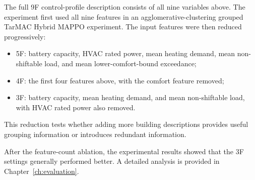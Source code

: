 The full 9F control-profile description consists of all nine variables above.
The experiment first used all nine features in an agglomerative-clustering
grouped TarMAC Hybrid MAPPO experiment. The input features were then reduced
progressively:
\begin{itemize}
  \item 5F: battery capacity, HVAC rated power, mean heating demand, mean
  non-shiftable load, and mean lower-comfort-bound exceedance;
  \item 4F: the first four features above, with the comfort feature removed;
  \item 3F: battery capacity, mean heating demand, and mean non-shiftable load,
  with HVAC rated power also removed.
\end{itemize}
This reduction tests whether adding more building descriptions provides useful
grouping information or introduces redundant information.

After the feature-count ablation, the experimental results showed that the 3F
settings generally performed better. A detailed analysis is provided in
Chapter~\ref{ch:evaluation}.

